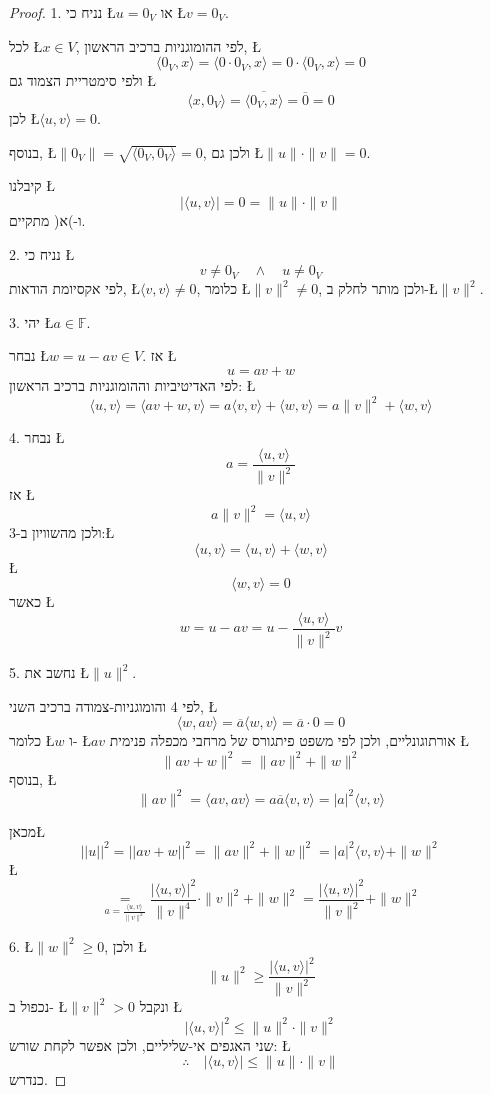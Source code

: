 \documentclass[english,hebrew]{article}
\begin{document}
\begin{proof}
1. נניח כי \L{$u=0_{V}$} או \L{$v=0_{V}$}. 

לכל \L{$x\in V$}, לפי ההומוגניות ברכיב הראשון, \L{%
\[
\langle0_{V},x\rangle=\langle0\cdot0_{V},x\rangle=0\cdot\langle0_{V},x\rangle=0
\]
}%
ולפי סימטריית הצמוד גם \L{%
\[
\langle x,0_{V}\rangle=\overline{\langle0_{V},x\rangle}=\overline{0}=0
\]
}%
לכן \L{$\langle u,v\rangle=0$}. 

בנוסף, \L{$\|0_{V}\|=\sqrt{\langle0_{V},0_{V}\rangle}=0$}, ולכן גם
\L{$\|u\|\cdot\|v\|=0$}. 

קיבלנו \L{%
\[
\left|\langle u,v\rangle\right|=0=\|u\|\cdot\|v\|
\]
}%
ו-)א( מתקיים.

2. נניח כי \L{%
\[
v\neq0_{V}\quad\wedge\quad u\neq0_{V}
\]
}%
לפי אקסיומת הודאות, \L{$\langle v,v\rangle\neq0$}, כלומר \L{$\|v\|^{2}\neq0$},
ולכן מותר לחלק ב-\L{$\|v\|^{2}$}.

3. יהי \L{$a\in\mathbb{F}$}. 

נבחר \L{$w=u-av\in V$}. אז \L{%
\[
u=av+w
\]
}%
לפי האדיטיביות וההומוגניות ברכיב הראשון: \L{%
\[
\langle u,v\rangle=\langle av+w,v\rangle=a\langle v,v\rangle+\langle w,v\rangle=a\|v\|^{2}+\langle w,v\rangle
\]
}%

4. נבחר \L{%
\[
a=\frac{\langle u,v\rangle}{\|v\|^{2}}
\]
}%
אז \L{%
\[
a\|v\|^{2}=\langle u,v\rangle
\]
}%
ולכן מהשוויון ב-3:\L{%
\[
\langle u,v\rangle=\langle u,v\rangle+\langle w,v\rangle
\]
}%
 \L{%
\[
\langle w,v\rangle=0
\]
}%
כאשר \L{%
\[
w=u-av=u-\frac{\langle u,v\rangle}{\|v\|^{2}}v
\]
}%

5. נחשב את \L{$\|u\|^{2}$}.

לפי 4 והומוגניות-צמודה ברכיב השני, \L{%
\[
\langle w,av\rangle=\overline{a}\langle w,v\rangle=\overline{a}\cdot0=0
\]
}%
כלומר \L{$w$} ו- \L{$av$} אורתוגונליים, ולכן לפי משפט פיתגורס של
מרחבי מכפלה פנימית \L{%
\[
\|av+w\|^{2}=\|av\|^{2}+\|w\|^{2}
\]
}%
בנוסף, \L{%
\[
\|av\|^{2}=\langle av,av\rangle=a\overline{a}\langle v,v\rangle=|a|^{2}\langle v,v\rangle
\]
}%

מכאן\L{%
\[
\left|\left|u\right|\right|^{2}=\left|\left|av+w\right|\right|^{2}=\|av\|^{2}+\|w\|^{2}=|a|^{2}\langle v,v\rangle+\|w\|^{2}
\]
}%
\L{%
\[
\underset{a=\frac{\langle u,v\rangle}{\|v\|^{2}}}{=}\frac{\left|\langle u,v\rangle\right|^{2}}{\|v\|^{4}}\cdot\|v\|^{2}+\|w\|^{2}=\frac{\left|\langle u,v\rangle\right|^{2}}{\|v\|^{2}}+\|w\|^{2}
\]
}%

6. \L{$\|w\|^{2}\geq0$}, ולכן \L{%
\[
\|u\|^{2}\geq\frac{\left|\langle u,v\rangle\right|^{2}}{\|v\|^{2}}
\]
}%
נכפול ב- \L{$\|v\|^{2}>0$} ונקבל \L{%
\[
\left|\langle u,v\rangle\right|^{2}\leq\|u\|^{2}\cdot\|v\|^{2}
\]
}%
שני האגפים אי-שליליים, ולכן אפשר לקחת שורש: \L{%
\[
\therefore\quad\left|\langle u,v\rangle\right|\leq\|u\|\cdot\|v\|
\]
}%
כנדרש.
\end{proof}
\end{document}
